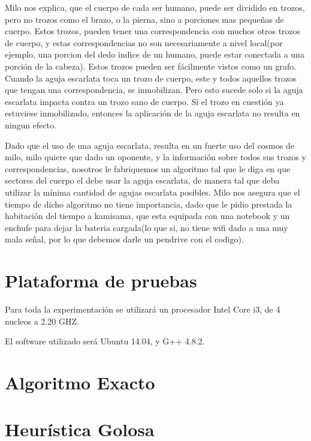 \documentclass[a4paper]{article}
\begin{document}
\begin{enumerate}
Milo nos explica, que el cuerpo de cada ser humano, puede ser dividido en trozos, pero no trozos como el brazo, o la pierna, sino a porciones mas pequeñas de cuerpo. Estos trozos, pueden tener una correspondencia con muchos otros trozos de cuerpo, y estas correspondencias no son necesariamente a nivel local(por ejemplo, una porcion del dedo indice de un humano, puede estar conectada a una porción de la cabeza). Estos trozos pueden ser fácilmente vistos como un grafo. Cuando la aguja escarlata toca un trozo de cuerpo, este y todos aquellos trozos que tengan una correspondencia, se inmobilizan. Pero esto sucede solo si la aguja escarlata impacta contra un trozo sano de cuerpo. Si el trozo en cuestión ya estuviese inmobilizado, entonces la aplicación de la aguja escarlata no resulta en ningun efecto.

Dado que el uso de una aguja escarlata, resulta en un fuerte uso del cosmos de milo, milo quiere que dado un oponente, y la información sobre todos sus trozos y correspondencias, nosotros le fabriquemos un algoritmo tal que le diga en que sectores del cuerpo el debe usar la aguja escarlata, de manera tal que deba utilizar la mínima cantidad de agujas escarlata posibles. Milo nos asegura que el tiempo de dicho algoritmo no tiene importancia, dado que le pidio prestada la habitación del tiempo a kamisama, que esta equipada con una notebook y un enchufe para dejar la bateria cargada(lo que si, no tiene wifi dado a una muy mala señal, por lo que debemos darle un pendrive con el codigo).


\end{enumerate} 

\section{Plataforma de pruebas}

Para toda la experimentación se utilizará un procesador Intel Core i3, de 4 nucleos a 2.20 GHZ.

El software utilizado será Ubuntu 14.04, y G++ 4.8.2.
\newpage
\section{Algoritmo Exacto}


\newpage
\section{Heurística Golosa}

\end{document}
